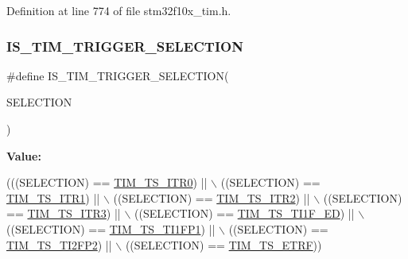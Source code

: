 Definition at line 774 of file stm32f10x\+\_\+tim.\+h.

\mbox{\label{group___t_i_m___internal___trigger___selection_ga36e47cf625c695a368a68280e950dfbc}} 
\subsubsection{\texorpdfstring{I\+S\+\_\+\+T\+I\+M\+\_\+\+T\+R\+I\+G\+G\+E\+R\+\_\+\+S\+E\+L\+E\+C\+T\+I\+ON}{IS\_TIM\_TRIGGER\_SELECTION}}
{\footnotesize\ttfamily \#define I\+S\+\_\+\+T\+I\+M\+\_\+\+T\+R\+I\+G\+G\+E\+R\+\_\+\+S\+E\+L\+E\+C\+T\+I\+ON(\begin{DoxyParamCaption}\item[{}]{S\+E\+L\+E\+C\+T\+I\+ON }\end{DoxyParamCaption})}

{\bfseries Value\+:}
\begin{DoxyCode}
(((SELECTION) == \hyperlink{group___t_i_m___internal___trigger___selection_gab7cf2b7db3956d4fd1e5a5d84f4891e7}{TIM\_TS\_ITR0}) || \(\backslash\)
                                             ((SELECTION) == \hyperlink{group___t_i_m___internal___trigger___selection_gad90fbca297153ca9c0112a67ea2c6cb3}{TIM\_TS\_ITR1}) || \(\backslash\)
                                             ((SELECTION) == \hyperlink{group___t_i_m___internal___trigger___selection_ga8599ba58a5f911d648503c7ac55d4320}{TIM\_TS\_ITR2}) || \(\backslash\)
                                             ((SELECTION) == \hyperlink{group___t_i_m___internal___trigger___selection_ga63183e611b91c5847040172c0069514d}{TIM\_TS\_ITR3}) || \(\backslash\)
                                             ((SELECTION) == \hyperlink{group___t_i_m___internal___trigger___selection_ga8c89554efc693e679c94b5a749af123c}{TIM\_TS\_TI1F\_ED}) || \(\backslash\)
                                             ((SELECTION) == \hyperlink{group___t_i_m___internal___trigger___selection_ga38d3514d54bcdb0ea8ac8bd91c5832b5}{TIM\_TS\_TI1FP1}) || \(\backslash\)
                                             ((SELECTION) == \hyperlink{group___t_i_m___internal___trigger___selection_ga0ed58a269bccd3f22d19cc9a2ba3123f}{TIM\_TS\_TI2FP2}) || \(\backslash\)
                                             ((SELECTION) == \hyperlink{group___t_i_m___internal___trigger___selection_gaece08e02e056613a882aa7ff0a6ccc2d}{TIM\_TS\_ETRF}))
\end{DoxyCode}


